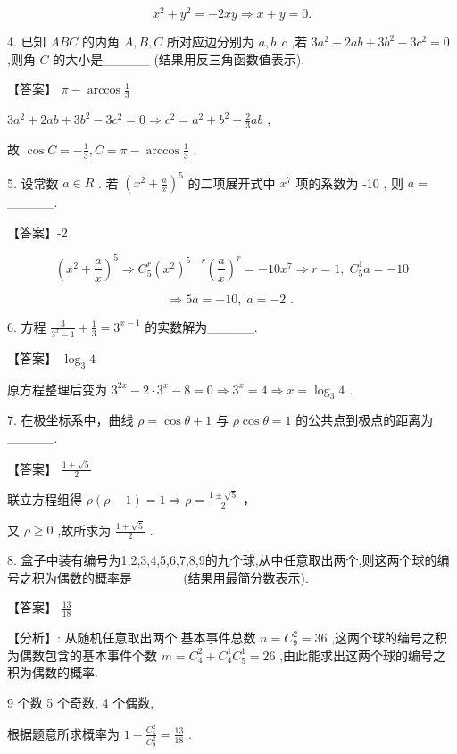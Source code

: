 \documentclass[10pt]{article}
\begin{document}
\[
{x}^{2} + {y}^{2} =  - {2xy} \Rightarrow  x + y = 0.
\]

4. 已知 \({ABC}\) 的内角 \(A,B,C\) 所对应边分别为 \(a,b,c\) ,若 \(3{a}^{2} + {2ab} + 3{b}^{2} - 3{c}^{2} = 0\) ,则角 \(C\) 的大小是\_\_\_\_\_ (结果用反三角函数值表示).

【答案】 \(\pi  - \arccos \frac{1}{3}\)

\(3{a}^{2} + {2ab} + 3{b}^{2} - 3{c}^{2} = 0 \Rightarrow  {c}^{2} = {a}^{2} + {b}^{2} + \frac{2}{3}{ab}\) ,

故 \(\cos C =  - \frac{1}{3},C = \pi  - \arccos \frac{1}{3}\) .

5. 设常数 \(a \in  R\) . 若 \({\left( {x}^{2} + \frac{a}{x}\right) }^{5}\) 的二项展开式中 \({x}^{7}\) 项的系数为 -10 , 则 \(a =\) \_\_\_\_\_.

【答案】-2

\[
{\left( {x}^{2} + \frac{a}{x}\right) }^{5} \Rightarrow  {C}_{5}^{r}{\left( {x}^{2}\right) }^{5 - r}{\left( \frac{a}{x}\right) }^{r} =  - {10}{x}^{7} \Rightarrow  r = 1,\;{C}_{5}^{1}a =  - {10}
\]

\[
\Rightarrow  {5a} =  - {10},\;a =  - 2\text{ . }
\]

6. 方程 \(\frac{3}{{3}^{x} - 1} + \frac{1}{3} = {3}^{x - 1}\) 的实数解为\_\_\_\_\_.

【答案】 \({\log }_{3}4\)

原方程整理后变为 \({3}^{2x} - 2 \cdot  {3}^{x} - 8 = 0 \Rightarrow  {3}^{x} = 4 \Rightarrow  x = {\log }_{3}4\) .

7. 在极坐标系中，曲线 \(\rho  = \cos \theta  + 1\) 与 \(\rho \cos \theta  = 1\) 的公共点到极点的距离为\_\_\_\_\_.

【答案】 \(\frac{1 + \sqrt{5}}{2}\)

联立方程组得 \(\rho \left( {\rho  - 1}\right)  = 1 \Rightarrow  \rho  = \frac{1 \pm  \sqrt{5}}{2}\) ，

又 \(\rho  \geq  0\) ,故所求为 \(\frac{1 + \sqrt{5}}{2}\) .

8. 盒子中装有编号为1,2,3,4,5,6,7,8,9的九个球,从中任意取出两个,则这两个球的编号之积为偶数的概率是\_\_\_\_\_ (结果用最简分数表示).

【答案】 \(\frac{13}{18}\)

【分析】: 从随机任意取出两个,基本事件总数 \(n = {C}_{9}^{2} = {36}\) ,这两个球的编号之积为偶数包含的基本事件个数 \(m = {C}_{4}^{2} + {C}_{4}^{1}{C}_{5}^{1} = {26}\) ,由此能求出这两个球的编号之积为偶数的概率.

9 个数 5 个奇数, 4 个偶数,

根据题意所求概率为 \(1 - \frac{{C}_{5}^{2}}{{C}_{9}^{2}} = \frac{13}{18}\) .
\end{document}
